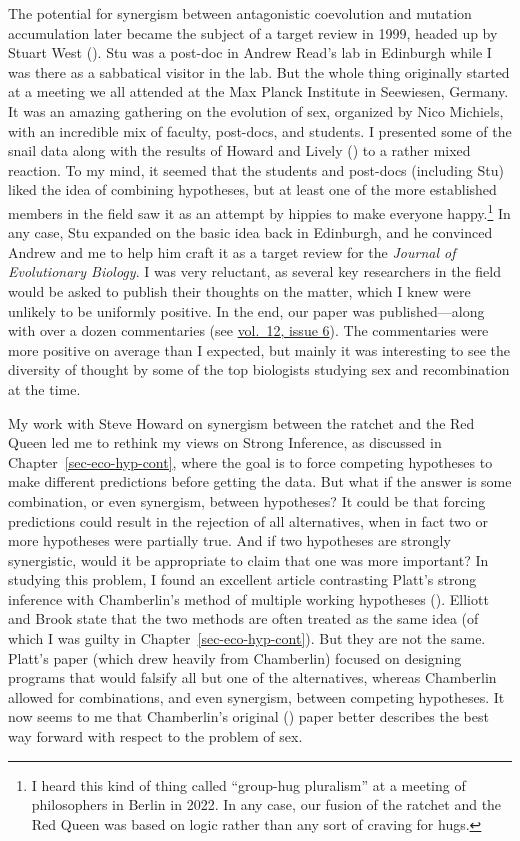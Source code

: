 \documentclass[
  letterpaper,
]{book}
\begin{document}
The potential for synergism between antagonistic coevolution and
mutation accumulation later became the subject of a target review in
1999, headed up by Stuart West (). Stu was
a post-doc in Andrew Read's lab in Edinburgh while I was there as a
sabbatical visitor in the lab. But the whole thing originally started at
a meeting we all attended at the Max Planck Institute in Seewiesen,
Germany. It was an amazing gathering on the evolution of sex, organized
by Nico Michiels, with an incredible mix of faculty, post-docs, and
students. I presented some of the snail data along with the results of
Howard and Lively () to a rather mixed
reaction. To my mind, it seemed that the students and post-docs
(including Stu) liked the idea of combining hypotheses, but at least one
of the more established members in the field saw it as an attempt by
hippies to make everyone happy.\footnote{I heard this kind of thing
  called ``group-hug pluralism'' at a meeting of philosophers in Berlin
  in 2022. In any case, our fusion of the ratchet and the Red Queen was
  based on logic rather than any sort of craving for hugs.} In any case,
Stu expanded on the basic idea back in Edinburgh, and he convinced
Andrew and me to help him craft it as a target review for the
\emph{Journal of Evolutionary Biology}. I was very reluctant, as several
key researchers in the field would be asked to publish their thoughts on
the matter, which I knew were unlikely to be uniformly positive. In the
end, our paper was published---along with over a dozen commentaries (see
\href{https://onlinelibrary.wiley.com/toc/14209101/1999/12/6}{vol.~12,
issue 6}). The commentaries were more positive on average than I
expected, but mainly it was interesting to see the diversity of thought
by some of the top biologists studying sex and recombination at the
time.

My work with Steve Howard on synergism between the ratchet and the Red
Queen led me to rethink my views on Strong Inference, as discussed in
Chapter~\ref{sec-eco-hyp-cont}, where the goal is to force competing
hypotheses to make different predictions before getting the data. But
what if the answer is some combination, or even synergism, between
hypotheses? It could be that forcing predictions could result in the
rejection of all alternatives, when in fact two or more hypotheses were
partially true. And if two hypotheses are strongly synergistic, would it
be appropriate to claim that one was more important? In studying this
problem, I found an excellent article contrasting Platt's strong
inference with Chamberlin's method of multiple working hypotheses
(). Elliott and Brook
state that the two methods are often treated as the same idea (of which
I was guilty in Chapter~\ref{sec-eco-hyp-cont}). But they are not the
same. Platt's paper (which drew heavily from Chamberlin) focused on
designing programs that would falsify all but one of the alternatives,
whereas Chamberlin allowed for combinations, and even synergism, between
competing hypotheses. It now seems to me that Chamberlin's original
() paper better describes the best
way forward with respect to the problem of sex.
\end{document}
